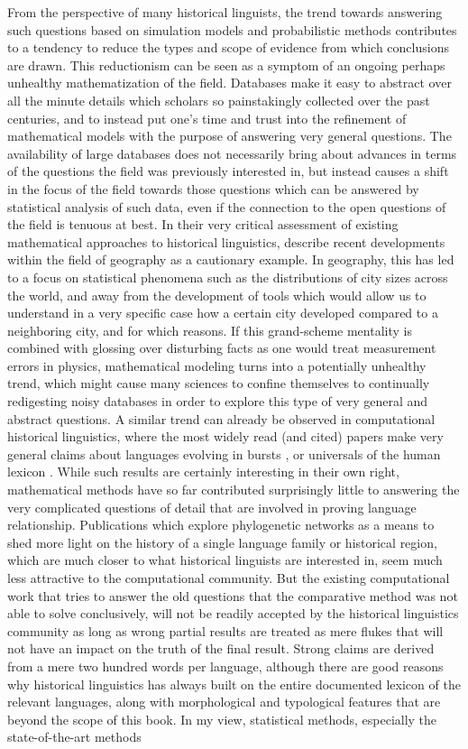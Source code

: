 From the perspective of many historical linguists, the trend towards answering such questions based on simulation models and probabilistic methods contributes to a tendency to reduce the types and scope of evidence from which conclusions are drawn. This reductionism can be seen as a symptom of an ongoing perhaps unhealthy mathematization of the field. Databases make it easy to abstract over all the minute details which scholars so painstakingly collected over the past centuries, and to instead put one's time and trust into the refinement of mathematical models with the purpose of answering very general questions. The availability of large databases does not necessarily bring about advances in terms of the questions the field was previously interested in, but instead causes a shift in the focus of the field towards those questions which can be answered by statistical analysis of such data, even if the connection to the open questions of the field is tenuous at best. In their very critical assessment of existing mathematical approaches to historical linguistics, \cite{pereltsvaig_lewis_2015} describe recent developments within the field of geography as a cautionary example. In geography, this has led to a focus on statistical phenomena such as the distributions of city sizes across the world, and away from the development of tools which would allow us to understand in a very specific case how a certain city developed compared to a neighboring city, and for which reasons. If this grand-scheme mentality is combined with glossing over disturbing facts as one would treat measurement errors in physics, mathematical modeling turns into a potentially unhealthy trend, which might cause many sciences to confine themselves to continually redigesting noisy databases in order to explore this type of very general and abstract questions. A similar trend can already be observed in computational historical linguistics, where the most widely read (and cited) papers make very general claims about languages evolving in bursts \citep{atkinson_ea_2008}, or universals of the human lexicon \citep{youn_ea_2016}. While such results are certainly interesting in their own right, mathematical methods have so far contributed surprisingly little to answering the very complicated questions of detail that are involved in proving language relationship. Publications which explore phylogenetic networks as a means to shed more light on the history of a single language family or historical region, which are much closer to what historical linguists are interested in, seem much less attractive to the computational community. But the existing computational work that tries to answer the old questions that the comparative method was not able to solve conclusively, will not be readily accepted by the historical linguistics community as long as wrong partial results are treated as mere flukes that will not have an impact on the truth of the final result. Strong claims are derived from a mere two hundred words per language, although there are good reasons why historical linguistics has always built on the entire documented lexicon of the relevant languages, along with morphological and typological features that are beyond the scope of this book. In my view, statistical methods, especially the state-of-the-art methods 